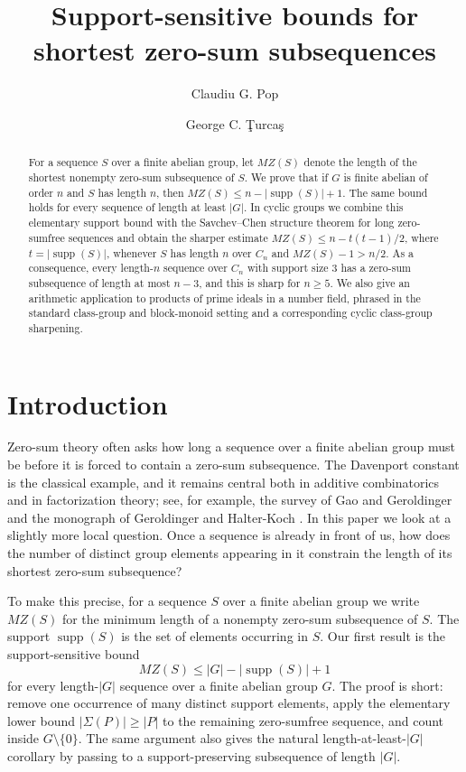 \documentclass[12pt,reqno]{amsart}
\title[Support-sensitive zero-sum bounds]{Support-sensitive bounds for shortest zero-sum subsequences}
\author{Claudiu G. Pop}
\author{George C. \c{T}urca\c{s}}
\theoremstyle{definition}
\theoremstyle{remark}
\DeclareMathOperator{\supp}{supp}
\begin{document}
\begin{abstract}
For a sequence $S$ over a finite abelian group, let $MZ(S)$ denote the length of the shortest nonempty zero-sum subsequence of $S$. We prove that if $G$ is finite abelian of order $n$ and $S$ has length $n$, then $MZ(S)\le n-|\supp(S)|+1$. The same bound holds for every sequence of length at least $|G|$. In cyclic groups we combine this elementary support bound with the Savchev--Chen structure theorem for long zero-sumfree sequences and obtain the sharper estimate $MZ(S)\le n-t(t-1)/2$, where $t=|\supp(S)|$, whenever $S$ has length $n$ over $C_n$ and $MZ(S)-1>n/2$. As a consequence, every length-$n$ sequence over $C_n$ with support size $3$ has a zero-sum subsequence of length at most $n-3$, and this is sharp for $n\ge 5$. We also give an arithmetic application to products of prime ideals in a number field, phrased in the standard class-group and block-monoid setting and a corresponding cyclic class-group sharpening.
\end{abstract}


\maketitle

\section{Introduction}

Zero-sum theory often asks how long a sequence over a finite abelian group must be before it is forced to contain a zero-sum subsequence.  The Davenport constant is the classical example, and it remains central both in additive combinatorics and in factorization theory; see, for example, the survey of Gao and Geroldinger \cite{GaoGer06} and the monograph of Geroldinger and Halter-Koch \cite{GeroldingerHalterKoch2006}.  In this paper we look at a slightly more local question.  Once a sequence is already in front of us, how does the number of distinct group elements appearing in it constrain the length of its shortest zero-sum subsequence?

To make this precise, for a sequence $S$ over a finite abelian group we write $MZ(S)$ for the minimum length of a nonempty zero-sum subsequence of $S$.  The support $\supp(S)$ is the set of elements occurring in $S$.  Our first result is the support-sensitive bound
\begin{equation} \label{eq:thm31}
  MZ(S)\le |G|-|\supp(S)|+1
\end{equation}
for every length-$|G|$ sequence over a finite abelian group $G$.  The proof is short: remove one occurrence of many distinct support elements, apply the elementary lower bound $|\Sigma(P)|\ge |P|$ to the remaining zero-sumfree sequence, and count inside $G\setminus\{0\}$.  The same argument also gives the natural length-at-least-$|G|$ corollary by passing to a support-preserving subsequence of length $|G|$.
\end{document}
